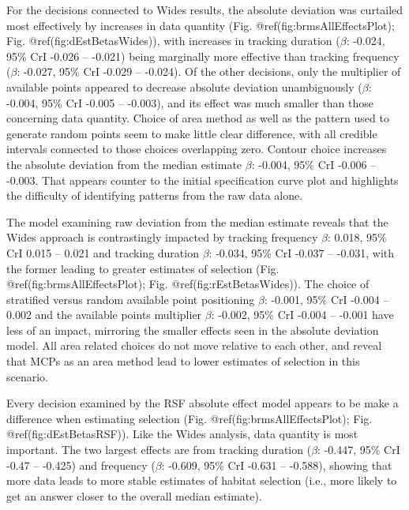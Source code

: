 \documentclass[10pt,a4paper]{article}
\begin{document}
For the decisions connected to Wides results, the absolute deviation was curtailed most effectively by increases in data quantity (Fig. @ref(fig:brmsAllEffectsPlot); Fig. @ref(fig:dEstBetasWides)), with increases in tracking duration (\(\beta\): -0.024, 95\% CrI -0.026 -- -0.021) being marginally more effective than tracking frequency (\(\beta\): -0.027, 95\% CrI -0.029 -- -0.024).
Of the other decisions, only the multiplier of available points appeared to decrease absolute deviation unambiguously (\(\beta\): -0.004, 95\% CrI -0.005 -- -0.003), and its effect was much smaller than those concerning data quantity.
Choice of area method as well as the pattern used to generate random points seem to make little clear difference, with all credible intervals connected to those choices overlapping zero.
Contour choice increases the absolute deviation from the median estimate \(\beta\): -0.004, 95\% CrI -0.006 -- -0.003.
That appears counter to the initial specification curve plot and highlights the difficulty of identifying patterns from the raw data alone.

The model examining raw deviation from the median estimate reveals that the Wides approach is contrastingly impacted by tracking frequency \(\beta\): 0.018, 95\% CrI 0.015 -- 0.021 and tracking duration \(\beta\): -0.034, 95\% CrI -0.037 -- -0.031, with the former leading to greater estimates of selection (Fig. @ref(fig:brmsAllEffectsPlot); Fig. @ref(fig:rEstBetasWides)).
The choice of stratified versus random available point positioning \(\beta\): -0.001, 95\% CrI -0.004 -- 0.002 and the available points multiplier \(\beta\): -0.002, 95\% CrI -0.004 -- -0.001 have less of an impact, mirroring the smaller effects seen in the absolute deviation model.
All area related choices do not move relative to each other, and reveal that MCPs as an area method lead to lower estimates of selection in this scenario.

Every decision examined by the RSF absolute effect model appears to be make a difference when estimating selection (Fig. @ref(fig:brmsAllEffectsPlot); Fig. @ref(fig:dEstBetasRSF)).
Like the Wides analysis, data quantity is most important.
The two largest effects are from tracking duration (\(\beta\): -0.447, 95\% CrI -0.47 -- -0.425) and frequency (\(\beta\): -0.609, 95\% CrI -0.631 -- -0.588), showing that more data leads to more stable estimates of habitat selection (i.e., more likely to get an answer closer to the overall median estimate).
\end{document}
